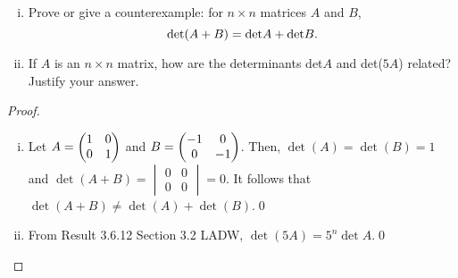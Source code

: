 \begin{question}
	\normalfont
	
\begin{enumerate}[(i)]

\item Prove or give a counterexample: for $n \times n$ matrices $A$ and $B$, 
\[
\textup{det}(A + B) = \textup{det} A + \textup{det} B.
\]	


\item If $A$ is an $n \times n$ matrix, how are the determinants det$A$ and det($5A$) related? Justify your answer.
 
 \end{enumerate}
 
\end{question}

\begin{proof}
    \renewcommand{\qedsymbol}{$\blacksquare$}
    \begin{enumerate}[(i)]
        \item Let $A=\begin{pmatrix} 1 &0\\ 0 &1 \end{pmatrix}$ and $B=\begin{pmatrix} -1 &0\\ 0 &-1 \end{pmatrix}$.
        Then, $\det(A)=\det(B)=1$ and $\det(A+B)=\begin{vmatrix}
            0 & 0\\
            0 & 0
        \end{vmatrix}=0$.
        It follows that $\det(A+B)\not=\det(A)+\det(B)$.\qed
        \item From Result 3.6.12 Section 3.2 LADW, $\det(5A)=5^n\det A$.\qed
    \end{enumerate}
    \renewcommand{\qedsymbol}{}
\end{proof}